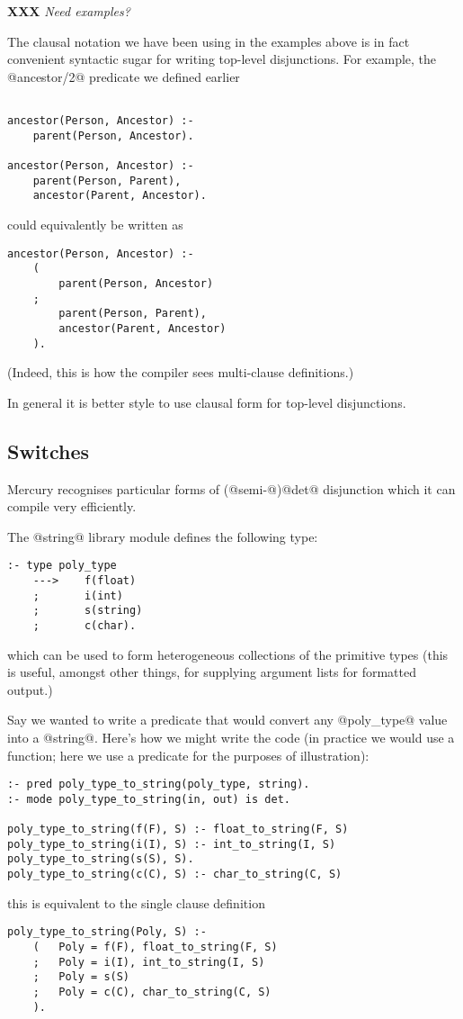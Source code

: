 \documentclass[a4paper,11pt,notitlepage,onecolumn]{article}
\newcommand{\XXX}[1]%
{{\small\textbf{XXX} \emph{#1}}}
\begin{document}
\XXX{Need examples?}

The clausal notation we have been using in the examples above
is in fact convenient syntactic sugar for writing top-level
disjunctions.  For example, the @ancestor/2@ predicate we
defined earlier
\begin{verbatim}

ancestor(Person, Ancestor) :-
    parent(Person, Ancestor).

ancestor(Person, Ancestor) :-
    parent(Person, Parent),
    ancestor(Parent, Ancestor).
\end{verbatim}
could equivalently be written as
\begin{verbatim}
ancestor(Person, Ancestor) :-
    (
        parent(Person, Ancestor)
    ;
        parent(Person, Parent),
        ancestor(Parent, Ancestor)
    ).
\end{verbatim}
(Indeed, this is how the compiler sees multi-clause
definitions.)

In general it is better style to use clausal form for
top-level disjunctions.

\subsection{Switches}
Mercury recognises particular forms of (@semi-@)@det@
disjunction which it can compile very efficiently.

The @string@ library module defines the following type:
\begin{verbatim}
:- type poly_type
    --->    f(float)
    ;       i(int)
    ;       s(string)
    ;       c(char).
\end{verbatim}
which can be used to form heterogeneous collections of the
primitive types (this is useful, amongst other things, for
supplying argument lists for formatted output.)

Say we wanted to write a predicate that would convert any
@poly_type@ value into a @string@.  Here's how we might write the
code (in practice we would use a function; here we use a
predicate for the purposes of illustration):
\begin{verbatim}
:- pred poly_type_to_string(poly_type, string).
:- mode poly_type_to_string(in, out) is det.

poly_type_to_string(f(F), S) :- float_to_string(F, S)
poly_type_to_string(i(I), S) :- int_to_string(I, S)
poly_type_to_string(s(S), S).
poly_type_to_string(c(C), S) :- char_to_string(C, S)
\end{verbatim}
this is equivalent to the single clause definition
\begin{verbatim}
poly_type_to_string(Poly, S) :-
    (   Poly = f(F), float_to_string(F, S)
    ;   Poly = i(I), int_to_string(I, S)
    ;   Poly = s(S)
    ;   Poly = c(C), char_to_string(C, S)
    ).
\end{verbatim}
\end{document}
